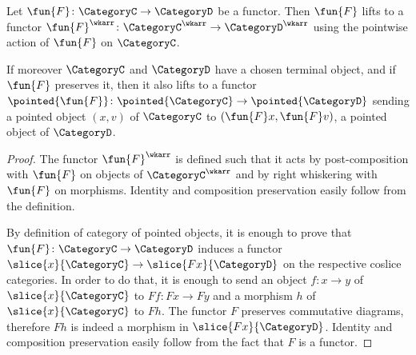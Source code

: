 
    \begingroup
    \def\theproposition{\ref{prop: functoriality of arrow and pointed cats}}
    \begin{proposition}
        Let $\fun{F}\colon \CategoryC \to \CategoryD$ be a functor.
        Then $\fun{F}$ lifts to a functor $\fun{F}^\wkarr\colon \CategoryC^\wkarr \to \CategoryD^\wkarr$
        using the pointwise action of $\fun{F}$ on $\CategoryC$. 
        
        If moreover $\CategoryC$ and $\CategoryD$ have a chosen terminal object, and if $\fun{F}$ preserves it, then it also lifts to a functor $\pointed{\fun{F}}\colon \pointed{\CategoryC} \to \pointed{\CategoryD}$ sending a pointed object $(x, v)$ of $\CategoryC$ to $(\fun{F}x, \fun{F}v)$, a pointed object of $\CategoryD$.
    \end{proposition}
    \addtocounter{proposition}{-1}
    \endgroup
    \begin{proof}
    The functor $\fun{F}^\wkarr$ is defined such that it acts by post-composition with $\fun{F}$ on objects of $\CategoryC^\wkarr$ and by right whiskering with $\fun{F}$ on morphisms. Identity and composition preservation easily follow from the definition. 

    By definition of category of pointed objects, it is enough to prove that $\fun{F}\colon \CategoryC \to \CategoryD$ induces a functor $\slice{x}{\CategoryC} \to \slice{Fx}{\CategoryD}$ on the respective coslice categories. In order to do that, it is enough to send an object $f:x \to y$ of $\slice{x}{\CategoryC}$ to $Ff: Fx \to Fy$ and a morphism $h$ of $\slice{x}{\CategoryC}$ to $Fh$. The functor $F$ preserves commutative diagrams, therefore $Fh$ is indeed a morphism in $\slice{Fx}{\CategoryD}$. Identity and composition preservation easily follow from the fact that $F$ is a functor. 
    \end{proof}

